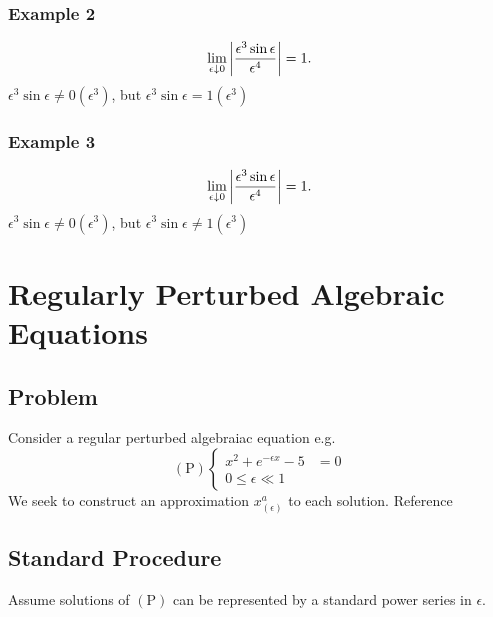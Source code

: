 \documentclass[12pt,twoside]{article}
\begin{document}
\subsubsection{Example 2}
$$\lim_{\epsilon\downarrow0}\left|{\frac{\epsilon^3\sin\epsilon}{\epsilon^4}}\right|=1.$$
$\epsilon^3\sin\epsilon\ne0(\epsilon^3)$, but $\epsilon^3\sin\epsilon=1(\epsilon^3)$
\subsubsection{Example 3}
$$\lim_{\epsilon\downarrow0}\left|{\frac{\epsilon^3\sin\epsilon}{\epsilon^4}}\right|=1.$$
$\epsilon^3\sin\epsilon\ne0(\epsilon^3)$, but $\epsilon^3\sin\epsilon\ne1(\epsilon^3)$

\section{Regularly Perturbed Algebraic Equations}
\subsection{Problem}
Consider a regular perturbed algebraiac equation e.g.
\begin{equation}
  (\text{P}) \left\{
    \begin{aligned}
      x^2+e^{-\epsilon x} - 5 &= 0\\
      0 \le \epsilon \ll 1
    \end{aligned}
  \right.
\end{equation}
We seek to construct an approximation $x^{a}_{(\epsilon)}$ to each solution.
Reference 
\subsection{Standard Procedure}
Assume solutions of $(\text{P})$ can be represented by a standard power series
in $\epsilon$.
\end{document}
